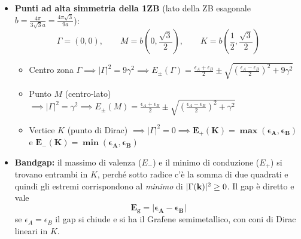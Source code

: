 \begin{itemize}
    \setlength{\itemsep}{1pt}
    \item \textbf{Punti ad alta simmetria della 1ZB} (lato della ZB esagonale $b = \frac{4\pi}{3\sqrt3 a} = \frac{4\pi\sqrt3}{9a}$):
    \[ \Gamma=(0,0), \qquad M = b\left(0,\frac{\sqrt3}{2}\right), \qquad K = b\left(\frac12,\frac{\sqrt3}{2}\right) \]
    \begin{itemize}
        \item Centro zona $\Gamma \implies |\Gamma|^2 = 9\gamma^2 \implies E_\pm(\Gamma)=\frac{\epsilon_A+\epsilon_B}{2}\pm\sqrt{\left(\frac{\epsilon_A-\epsilon_B}{2}\right)^2+9\gamma^2}$
        \item Punto $M$ (centro-lato) $\implies |\Gamma|^2 = \gamma^2 \implies E_\pm(M)=\frac{\epsilon_A+\epsilon_B}{2}\pm\sqrt{\left(\frac{\epsilon_A-\epsilon_B}{2}\right)^2+\gamma^2}$
        \item Vertice $K$ (punto di Dirac) $\implies |\Gamma|^2 = 0 \implies \bm{E_+(K)=\max(\epsilon_A,\epsilon_B)}$ e $\bm{E_-(K)=\min(\epsilon_A,\epsilon_B)}$
    \end{itemize}
    \item \textbf{Bandgap:} il massimo di valenza ($E_-$) e il minimo di conduzione ($E_+$) si trovano entrambi in $K$, perché sotto radice c'è la somma di due quadrati e quindi gli estremi corrispondono al \emph{minimo} di $|\Gamma(\mathbf{k})|^2\ge0$. Il gap è diretto e vale
    \[ \bm{E_g = |\epsilon_A-\epsilon_B|} \]
    se $\epsilon_A=\epsilon_B$ il gap si chiude e si ha il Grafene semimetallico, con coni di Dirac lineari in $K$.
\end{itemize}


